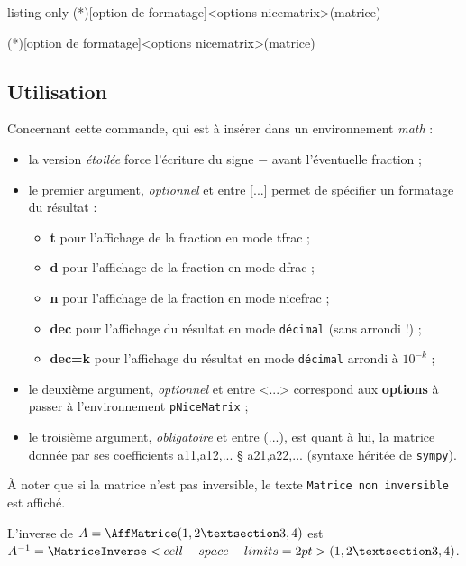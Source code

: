 \documentclass[a4paper,11pt]{article}
\newcommand\Cle[1]{{\bfseries\sffamily\textlangle #1\textrangle}}
\begin{document}
\begin{PresentationCode}{listing only}
\MatriceInverse(*)[option de formatage]<options nicematrix>(matrice)

\MatriceInversePY(*)[option de formatage]<options nicematrix>(matrice)
\end{PresentationCode}

\subsection{Utilisation}

\begin{tipblock}
Concernant cette commande, qui est à insérer dans un environnement \textit{math} :

\begin{itemize}
	\item la version \textit{étoilée} force l'écriture du signe \og $-$ \fg{} avant l'éventuelle fraction ;
	\item le premier argument, \textit{optionnel} et entre \textsf{[...]} permet de spécifier un formatage du résultat :
	\begin{itemize}
		\item \Cle{t} pour l'affichage de la fraction en mode \textsf{tfrac} ;
		\item \Cle{d} pour l'affichage de la fraction en mode \textsf{dfrac} ;
		\item \Cle{n} pour l'affichage de la fraction en mode \textsf{nicefrac} ;
		\item \Cle{dec} pour l'affichage du résultat en mode \texttt{décimal} (sans arrondi !) ;
		\item \Cle{dec=k} pour l'affichage du résultat en mode \texttt{décimal} arrondi à $10^{-k}$ ;
	\end{itemize}
	\item le deuxième argument, \textit{optionnel} et entre \textsf{<...>} correspond aux \Cle{options} à passer à l'environnement \texttt{pNiceMatrix} ;
	\item le troisième argument, \textit{obligatoire} et entre \textsf{(...)}, est quant à lui, la matrice donnée par ses coefficients \textsf{a11,a12,... § a21,a22,...} (syntaxe héritée de \texttt{sympy}).
\end{itemize}
À noter que si la matrice n'est pas inversible, le texte \texttt{Matrice non inversible} est affiché.
\end{tipblock}

\begin{PresentationCode}{}
L'inverse de $A=\AffMatrice(1,2 § 3,4)$ est
$A^{-1}=\MatriceInverse<cell-space-limits=2pt>(1,2 § 3,4)$.
\end{PresentationCode}
\end{document}

